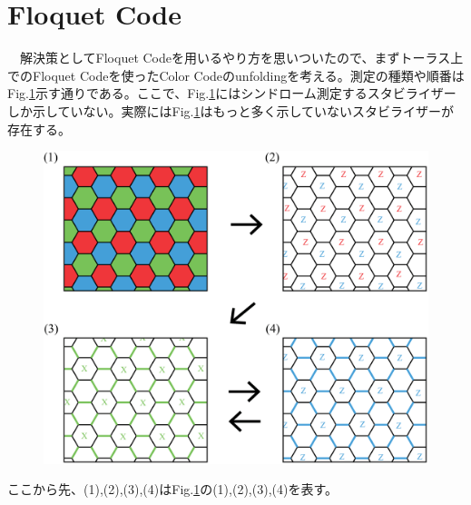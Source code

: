 \documentclass[a4paper,10pt]{ltjsarticle}
\begin{document}
\section{Floquet Code}{
    　解決策としてFloquet Codeを用いるやり方を思いついたので、まずトーラス上でのFloquet Codeを使ったColor Codeのunfoldingを考える。測定の種類や順番はFig.\ref{figure6}示す通りである。ここで、Fig.\ref{figure6}にはシンドローム測定するスタビライザーしか示していない。実際にはFig.\ref{figure6}はもっと多く示していないスタビライザーが存在する。

    \begin{figure}[h]
        \centering
        \includegraphics[scale=0.3]{figure/figure6.eps}
        \caption{ }
        \label{figure6}
    \end{figure}

    ここから先、(1),(2),(3),(4)はFig.\ref{figure6}の(1),(2),(3),(4)を表す。

}
\end{document}
